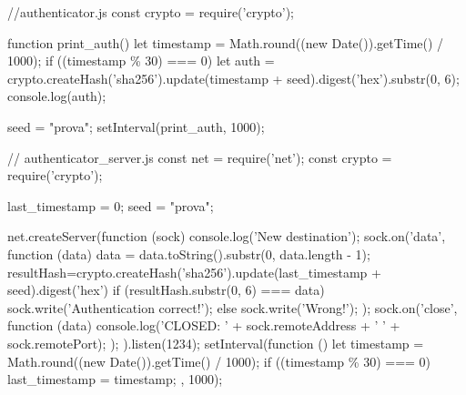 \begin{Answer}[ref={authenticator}]
  
  \begin{js}
    //authenticator.js
    const crypto = require('crypto');
    
    function print_auth() {
      let timestamp = Math.round((new Date()).getTime() / 1000);
      if ((timestamp \% 30) === 0) {
      let auth = crypto.createHash('sha256').update(timestamp + seed).digest('hex').substr(0, 6);
        console.log(auth);
      }
    }
    
    seed = "prova";
    setInterval(print_auth, 1000);
  \end{js}
  
  
  \begin{js}
    // authenticator\_server.js
    const net = require('net');
    const crypto = require('crypto');
    
    last_timestamp = 0;
    seed = "prova";
    
    net.createServer(function (sock) {
      console.log('New destination');
      sock.on('data', function (data) {
        data = data.toString().substr(0, data.length - 1);
        resultHash=crypto.createHash('sha256').update(last_timestamp + seed).digest('hex')
        if (resultHash.substr(0, 6) === data) {
          sock.write('Authentication correct!\n');
        }
        else {
          sock.write('Wrong!\n');
        }
      });
      sock.on('close', function (data) {
        console.log('CLOSED: ' + sock.remoteAddress + ' ' + sock.remotePort);
      });
    }).listen(1234);
    setInterval(function () {
      let timestamp = Math.round((new Date()).getTime() / 1000);
      if ((timestamp \% 30) === 0) {
        last_timestamp = timestamp;
      }
    }, 1000);
  \end{js}
\end{Answer}